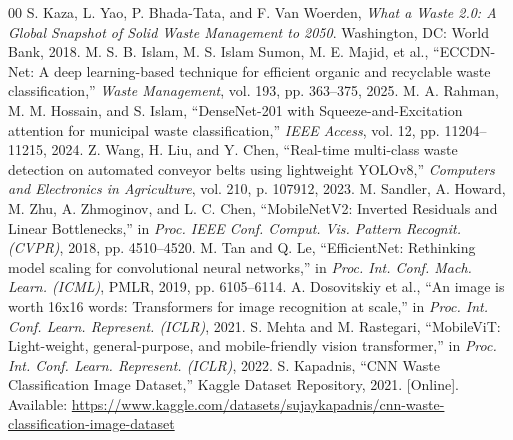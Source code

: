 \documentclass[conference]{IEEEtran}
\begin{document}
\begin{thebibliography}{00}
 S. Kaza, L. Yao, P. Bhada-Tata, and F. Van Woerden, \textit{What a Waste 2.0: A Global Snapshot of Solid Waste Management to 2050}. Washington, DC: World Bank, 2018.
 M. S. B. Islam, M. S. Islam Sumon, M. E. Majid, et al., ``ECCDN-Net: A deep learning-based technique for efficient organic and recyclable waste classification,'' \textit{Waste Management}, vol. 193, pp. 363--375, 2025.
 M. A. Rahman, M. M. Hossain, and S. Islam, ``DenseNet-201 with Squeeze-and-Excitation attention for municipal waste classification,'' \textit{IEEE Access}, vol. 12, pp. 11204--11215, 2024.
 Z. Wang, H. Liu, and Y. Chen, ``Real-time multi-class waste detection on automated conveyor belts using lightweight YOLOv8,'' \textit{Computers and Electronics in Agriculture}, vol. 210, p. 107912, 2023.
 M. Sandler, A. Howard, M. Zhu, A. Zhmoginov, and L. C. Chen, ``MobileNetV2: Inverted Residuals and Linear Bottlenecks,'' in \textit{Proc. IEEE Conf. Comput. Vis. Pattern Recognit. (CVPR)}, 2018, pp. 4510--4520.
 M. Tan and Q. Le, ``EfficientNet: Rethinking model scaling for convolutional neural networks,'' in \textit{Proc. Int. Conf. Mach. Learn. (ICML)}, PMLR, 2019, pp. 6105--6114.
 A. Dosovitskiy et al., ``An image is worth 16x16 words: Transformers for image recognition at scale,'' in \textit{Proc. Int. Conf. Learn. Represent. (ICLR)}, 2021.
 S. Mehta and M. Rastegari, ``MobileViT: Light-weight, general-purpose, and mobile-friendly vision transformer,'' in \textit{Proc. Int. Conf. Learn. Represent. (ICLR)}, 2022.
 S. Kapadnis, ``CNN Waste Classification Image Dataset,'' Kaggle Dataset Repository, 2021. [Online]. Available: \url{https://www.kaggle.com/datasets/sujaykapadnis/cnn-waste-classification-image-dataset}
\end{thebibliography}
\end{document}
